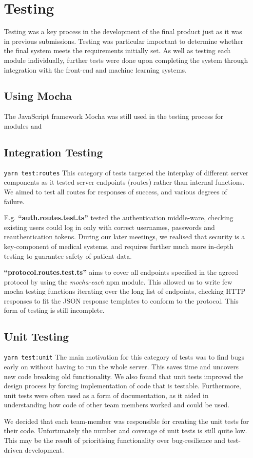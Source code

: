 \section{Testing}
Testing was a key process in the development of the final product just as it was in previous submissions. Testing was particular important to determine whether the final system meets the requirements initially set. As well as testing each module individually, further tests were done upon completing the system through integration with the front-end and machine learning systems.


\subsection{Using Mocha}
The JavaScript framework Mocha was still used in the testing process for modules and 
\subsection{Integration Testing}
\texttt{yarn test:routes}
This category of tests targeted the interplay of different server components as it tested server endpoints (routes) rather than internal functions. We aimed to test all routes for responses of success, and various degrees of failure. \par
E.g. \textbf{``auth.routes.test.ts''} tested the authentication middle-ware, checking existing users could log in only with correct usernames, passwords and reauthentication tokens. During our later meetings, we realised that security is a key-component of medical systems, and requires further much more in-depth testing to guarantee safety of patient data. \par
\textbf{``protocol.routes.test.ts''} aims to cover all endpoints specified in the agreed protocol by using the \textit{mocha-each} npm module. This allowed us to write few mocha testing functions iterating over the long list of endpoints, checking HTTP responses to fit the JSON response templates to conform to the protocol. This form of testing is still incomplete.
\subsection{Unit Testing}
\texttt{yarn test:unit}
The main motivation for this category of tests was to find bugs early on without having to run the whole server. This saves time and uncovers new code breaking old functionality. We also found that unit tests improved the design process by forcing implementation of code that is testable. Furthermore, unit tests were often used as a form of documentation, as it aided in understanding how code of other team members worked and could be used. \par
We decided that each team-member was responsible for creating the unit tests for their code. Unfortunately the number and coverage of unit tests is still quite low. This may be the result of prioritising functionality over bug-resilience and test-driven development.
